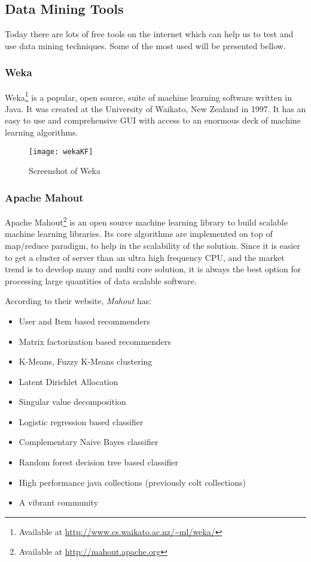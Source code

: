 \subsection{Data Mining Tools}
Today there are lots of free tools on the internet which can help us to test and use data mining techniques.
Some of the most used will be presented bellow.

\subsubsection{Weka}

Weka\footnote{ Available at \url{http://www.cs.waikato.ac.nz/~ml/weka/}} is a popular, open source, suite of machine learning software written in Java.
It was created at the University of Waikato, New Zealand in 1997. It has an easy to use and comprehensive GUI with access to an enormous deck of machine learning algorithms.

\begin{figure}[h]
  \begin{center}
    \leavevmode
    \texttt{[image: wekaKF]}
    \caption{Screenshot of Weka \protect\footnotemark}
    \label{fig:RapidMiner}
  \end{center}
\end{figure}

\subsubsection{Apache Mahout}

Apache Mahout\footnote{ Available at \url{http://mahout.apache.org}} is an open source machine learning library to build scalable machine learning libraries.
Its core algorithms are implemented on top of map/reduce paradigm, to help in the scalability of the solution.
Since it is easier to get a cluster of server than an ultra high frequency CPU, and the market trend is to develop many and multi core solution, it is always the best option for processing large quantities of data scalable software.

According to their website, \emph{Mahout} has:
\begin{itemize}

\item User and Item based recommenders
\item Matrix factorization based recommenders
\item K-Means, Fuzzy K-Means clustering
\item Latent Dirichlet Allocation
\item Singular value decomposition
\item Logistic regression based classifier
\item Complementary Naive Bayes classifier
\item Random forest decision tree based classifier
\item High performance java collections (previously colt collections)
\item  A vibrant community

\end{itemize}

